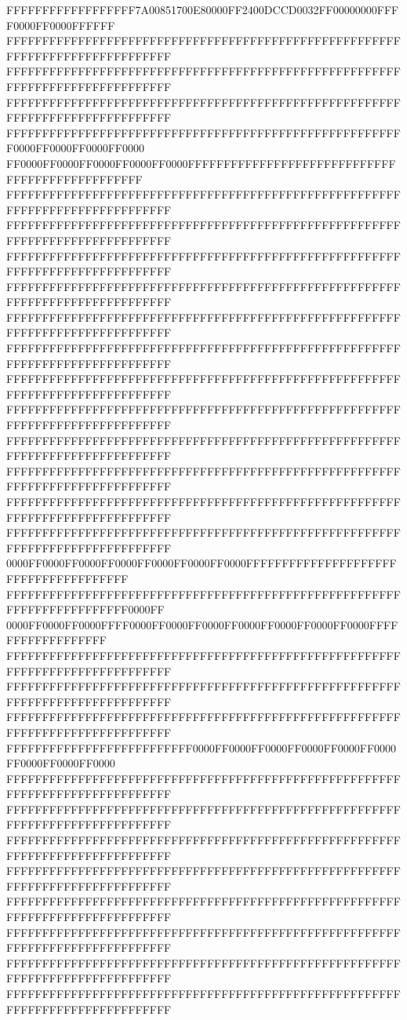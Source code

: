 FFFFFFFFFFFFFFFFFF7A00851700E80000FF2400DCCD0032FF00000000FFFF0000FF0000FFFFFF
FFFFFFFFFFFFFFFFFFFFFFFFFFFFFFFFFFFFFFFFFFFFFFFFFFFFFFFFFFFFFFFFFFFFFFFFFFFFFF
FFFFFFFFFFFFFFFFFFFFFFFFFFFFFFFFFFFFFFFFFFFFFFFFFFFFFFFFFFFFFFFFFFFFFFFFFFFFFF
FFFFFFFFFFFFFFFFFFFFFFFFFFFFFFFFFFFFFFFFFFFFFFFFFFFFFFFFFFFFFFFFFFFFFFFFFFFFFF
FFFFFFFFFFFFFFFFFFFFFFFFFFFFFFFFFFFFFFFFFFFFFFFFFFFFFFFF0000FF0000FF0000FF0000
FF0000FF0000FF0000FF0000FF0000FFFFFFFFFFFFFFFFFFFFFFFFFFFFFFFFFFFFFFFFFFFFFFFF
FFFFFFFFFFFFFFFFFFFFFFFFFFFFFFFFFFFFFFFFFFFFFFFFFFFFFFFFFFFFFFFFFFFFFFFFFFFFFF
FFFFFFFFFFFFFFFFFFFFFFFFFFFFFFFFFFFFFFFFFFFFFFFFFFFFFFFFFFFFFFFFFFFFFFFFFFFFFF
FFFFFFFFFFFFFFFFFFFFFFFFFFFFFFFFFFFFFFFFFFFFFFFFFFFFFFFFFFFFFFFFFFFFFFFFFFFFFF
FFFFFFFFFFFFFFFFFFFFFFFFFFFFFFFFFFFFFFFFFFFFFFFFFFFFFFFFFFFFFFFFFFFFFFFFFFFFFF
FFFFFFFFFFFFFFFFFFFFFFFFFFFFFFFFFFFFFFFFFFFFFFFFFFFFFFFFFFFFFFFFFFFFFFFFFFFFFF
FFFFFFFFFFFFFFFFFFFFFFFFFFFFFFFFFFFFFFFFFFFFFFFFFFFFFFFFFFFFFFFFFFFFFFFFFFFFFF
FFFFFFFFFFFFFFFFFFFFFFFFFFFFFFFFFFFFFFFFFFFFFFFFFFFFFFFFFFFFFFFFFFFFFFFFFFFFFF
FFFFFFFFFFFFFFFFFFFFFFFFFFFFFFFFFFFFFFFFFFFFFFFFFFFFFFFFFFFFFFFFFFFFFFFFFFFFFF
FFFFFFFFFFFFFFFFFFFFFFFFFFFFFFFFFFFFFFFFFFFFFFFFFFFFFFFFFFFFFFFFFFFFFFFFFFFFFF
FFFFFFFFFFFFFFFFFFFFFFFFFFFFFFFFFFFFFFFFFFFFFFFFFFFFFFFFFFFFFFFFFFFFFFFFFFFFFF
FFFFFFFFFFFFFFFFFFFFFFFFFFFFFFFFFFFFFFFFFFFFFFFFFFFFFFFFFFFFFFFFFFFFFFFFFFFFFF
FFFFFFFFFFFFFFFFFFFFFFFFFFFFFFFFFFFFFFFFFFFFFFFFFFFFFFFFFFFFFFFFFFFFFFFFFFFFFF
0000FF0000FF0000FF0000FF0000FF0000FF0000FFFFFFFFFFFFFFFFFFFFFFFFFFFFFFFFFFFFFF
FFFFFFFFFFFFFFFFFFFFFFFFFFFFFFFFFFFFFFFFFFFFFFFFFFFFFFFFFFFFFFFFFFFFFFFF0000FF
0000FF0000FF0000FFFF0000FF0000FF0000FF0000FF0000FF0000FF0000FFFFFFFFFFFFFFFFFF
FFFFFFFFFFFFFFFFFFFFFFFFFFFFFFFFFFFFFFFFFFFFFFFFFFFFFFFFFFFFFFFFFFFFFFFFFFFFFF
FFFFFFFFFFFFFFFFFFFFFFFFFFFFFFFFFFFFFFFFFFFFFFFFFFFFFFFFFFFFFFFFFFFFFFFFFFFFFF
FFFFFFFFFFFFFFFFFFFFFFFFFFFFFFFFFFFFFFFFFFFFFFFFFFFFFFFFFFFFFFFFFFFFFFFFFFFFFF
FFFFFFFFFFFFFFFFFFFFFFFFFF0000FF0000FF0000FF0000FF0000FF0000FF0000FF0000FF0000
FFFFFFFFFFFFFFFFFFFFFFFFFFFFFFFFFFFFFFFFFFFFFFFFFFFFFFFFFFFFFFFFFFFFFFFFFFFFFF
FFFFFFFFFFFFFFFFFFFFFFFFFFFFFFFFFFFFFFFFFFFFFFFFFFFFFFFFFFFFFFFFFFFFFFFFFFFFFF
FFFFFFFFFFFFFFFFFFFFFFFFFFFFFFFFFFFFFFFFFFFFFFFFFFFFFFFFFFFFFFFFFFFFFFFFFFFFFF
FFFFFFFFFFFFFFFFFFFFFFFFFFFFFFFFFFFFFFFFFFFFFFFFFFFFFFFFFFFFFFFFFFFFFFFFFFFFFF
FFFFFFFFFFFFFFFFFFFFFFFFFFFFFFFFFFFFFFFFFFFFFFFFFFFFFFFFFFFFFFFFFFFFFFFFFFFFFF
FFFFFFFFFFFFFFFFFFFFFFFFFFFFFFFFFFFFFFFFFFFFFFFFFFFFFFFFFFFFFFFFFFFFFFFFFFFFFF
FFFFFFFFFFFFFFFFFFFFFFFFFFFFFFFFFFFFFFFFFFFFFFFFFFFFFFFFFFFFFFFFFFFFFFFFFFFFFF
FFFFFFFFFFFFFFFFFFFFFFFFFFFFFFFFFFFFFFFFFFFFFFFFFFFFFFFFFFFFFFFFFFFFFFFFFFFFFF
